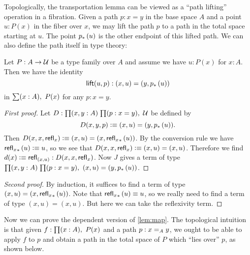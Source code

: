 Topologically, the transportation lemma can be viewed as a ``path lifting'' operation in a fibration.
Given a path $p:x=y$ in the base space $A$ and a point $u:P(x)$ in the fiber over $x$, we may lift the path $p$ to a path in the total space starting at $u$.
The point $\trans p u$ is the other endpoint of this lifted path.
We can also define the path itself in type theory:

\begin{thm}\label{thm:path_lifting}
Let $P:A\to\type$ be a type family over $A$ and assume we have $u:P(x)$ for $x:A$. Then we have the identity
\begin{equation*}
\mathsf{lift}(u,p):(x,u)=(y,\trans{p}{u})
\end{equation*}
in $\sm{x:A}P(x)$ for any $p:x=y$.
\end{thm}

\begin{proof}[First proof]
Let $D:\prd{x,y:A}{p:x=y}\type$ be defined by
\begin{equation*}
D(x,y,p)\defeq (x,u)=(y,\trans{p}{u}).
\end{equation*}
Then $D(x,x,\refl{x})\defeq (x,u)=(x,\trans{\refl{x}}{u})$. By the conversion rule we have $\trans{\refl{x}}{u}\defeq u$, so we see that $D(x,x,\refl{x})\defeq (x,u)=(x,u)$. Therefore we find $d(x)\defeq\refl{(x,u)}:D(x,x,\refl{x})$. Now $J$ gives a term of type $\prd{x,y:A}{p:x=y}(x,u)=(y,\trans{p}{u})$.
\end{proof}
\begin{proof}[Second proof] 
  By induction, it suffices to find a term of type $(x,u)=(x,\trans{\refl{x}}{u})$.
  Note that $\trans{\refl{x}}{u}\jdeq u$, so we really need to find a term of type $(x,u)=(x,u)$.
  But here we can take the reflexivity term.
\end{proof}

Now we can prove the dependent version of \autoref{lem:map}.
The topological intuition is that given $f:\prd{x:A} P(x)$ and a path $p:\id[A]xy$, we ought to be able to apply $f$ to $p$ and obtain a path in the total space of $P$ which ``lies over'' $p$, as shown below.

\begin{center}
\end{center}

